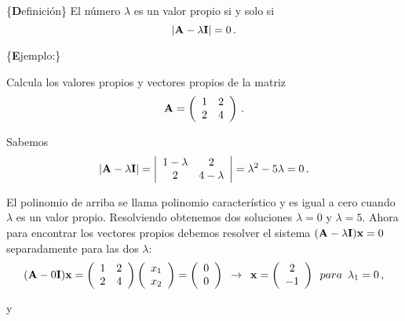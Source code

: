 \documentclass[
]{agujournal2019}
\begin{document}
\vspace{0.5cm}

\{\noindent \textbf Definición\} El número \(\lambda\) es un valor
propio si y solo si \[|{\textbf A}-\lambda{\textbf I}|=0\,.\]

\vspace{0.5cm}

\{\noindent \textbf Ejemplo:\}

\noindent Calcula los valores propios y vectores propios de la matriz
\[{\textbf A}=\left(\begin{array}{ccccc}
  1 & 2\\
  2 & 4\\
        \end{array}\right)\,.\]

\noindent Sabemos
\[|{\textbf A}-\lambda{\textbf I}|=\left|\begin{array}{ccccc}
  1-\lambda & 2\\
  2 & 4-\lambda\\
        \end{array}\right|=\lambda^2-5\lambda=0\,.\]

\noindent El polinomio de arriba se llama polinomio característico y es
igual a cero cuando \(\lambda\) es un valor propio. Resolviendo
obtenemos dos soluciones \(\lambda=0\) y \(\lambda=5\). Ahora para
encontrar los vectores propios debemos resolver el sistema
\(({\textbf A}-\lambda{\textbf I}){\textbf x}=0\) separadamente para las
dos \(\lambda\): \[({\textbf A}-0{\textbf I}){\textbf x}=
\left(\begin{array}{ccccc}
  1 & 2\\
  2 & 4\\
      \end{array}\right)
      \left(\begin{array}{c}
  x_1 \\
  x_2 \\
      \end{array}\right)=
      \left(\begin{array}{c}
  0 \\
  0 \\
      \end{array}\right)\,\,\,\rightarrow\,\,\,{\textbf x}=\left(\begin{array}{c}
  2 \\
  -1 \\
      \end{array}\right)\,\,\,{ para}\,\,\,\lambda_1=0\,,\]

y
\end{document}

